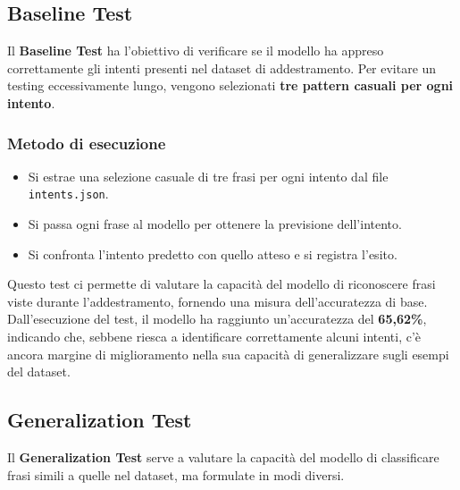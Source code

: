 \documentclass[12pt, letterpaper]{article}
\begin{document}
\subsection{Baseline Test}

Il \textbf{Baseline Test} ha l'obiettivo di verificare se il modello ha appreso correttamente gli intenti presenti nel dataset di addestramento. Per evitare un testing eccessivamente lungo, vengono selezionati \textbf{tre pattern casuali per ogni intento}.

\subsubsection{Metodo di esecuzione}
\begin{itemize}
	\item Si estrae una selezione casuale di tre frasi per ogni intento dal file \texttt{intents.json}.
	\item Si passa ogni frase al modello per ottenere la previsione dell'intento.
	\item Si confronta l'intento predetto con quello atteso e si registra l'esito.
\end{itemize}
Questo test ci permette di valutare la capacità del modello di riconoscere frasi viste durante l'addestramento, fornendo una misura dell'accuratezza di base.\\
\newline
Dall’esecuzione del test, il modello ha raggiunto un'accuratezza del \textbf{65,62\%}, indicando che, sebbene riesca a identificare correttamente alcuni intenti, c'è ancora margine di miglioramento nella sua capacità di generalizzare sugli esempi del dataset.

\subsection{Generalization Test}

Il \textbf{Generalization Test} serve a valutare la capacità del modello di classificare frasi simili a quelle nel dataset, ma formulate in modi diversi.
\end{document}
